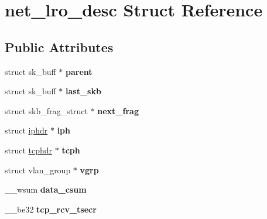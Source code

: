 \hypertarget{structnet__lro__desc}{
\section{net\_\-lro\_\-desc Struct Reference}
\label{structnet__lro__desc}
}
\subsection*{Public Attributes}
\begin{DoxyCompactItemize}
\item 
\hypertarget{structnet__lro__desc_a05258e6dd314431553b0c4ff2068219b}{
struct sk\_\-buff $\ast$ {\bfseries parent}}
\label{structnet__lro__desc_a05258e6dd314431553b0c4ff2068219b}

\item 
\hypertarget{structnet__lro__desc_a3741d3589c542db1f1e74c36f9695039}{
struct sk\_\-buff $\ast$ {\bfseries last\_\-skb}}
\label{structnet__lro__desc_a3741d3589c542db1f1e74c36f9695039}

\item 
\hypertarget{structnet__lro__desc_a956746bfea98a6701913073345ca7324}{
struct skb\_\-frag\_\-struct $\ast$ {\bfseries next\_\-frag}}
\label{structnet__lro__desc_a956746bfea98a6701913073345ca7324}

\item 
\hypertarget{structnet__lro__desc_ac179fc8359695e89c85a261fc74e862b}{
struct \hyperlink{structiphdr}{iphdr} $\ast$ {\bfseries iph}}
\label{structnet__lro__desc_ac179fc8359695e89c85a261fc74e862b}

\item 
\hypertarget{structnet__lro__desc_a03812a6261fa8c99ca48793b4014b15d}{
struct \hyperlink{structtcphdr}{tcphdr} $\ast$ {\bfseries tcph}}
\label{structnet__lro__desc_a03812a6261fa8c99ca48793b4014b15d}

\item 
\hypertarget{structnet__lro__desc_a966aea82210f2695bcfe85e8da1d6a10}{
struct vlan\_\-group $\ast$ {\bfseries vgrp}}
\label{structnet__lro__desc_a966aea82210f2695bcfe85e8da1d6a10}

\item 
\hypertarget{structnet__lro__desc_a1cfcef8f6066480e443671205f9253af}{
\_\-\_\-wsum {\bfseries data\_\-csum}}
\label{structnet__lro__desc_a1cfcef8f6066480e443671205f9253af}

\item 
\hypertarget{structnet__lro__desc_a827aa9464d59765d27c0d0d5d77a243c}{
\_\-\_\-be32 {\bfseries tcp\_\-rcv\_\-tsecr}}
\label{structnet__lro__desc_a827aa9464d59765d27c0d0d5d77a243c}


\end{DoxyCompactItemize}
